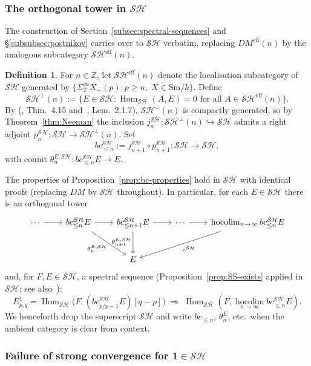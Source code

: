 \documentclass[12pt,a4paper]{article}
\theoremstyle{definition}
\newtheorem{definition}[theorem]{Definition}
\newcommand{\Sm}{\mathrm{Sm}}
\newcommand{\SH}{\mathcal{SH}}
\newcommand{\hocolim}{\operatorname*{hocolim}}
\newcommand{\Hom}{\operatorname{Hom}}
\newcommand{\Z}{\mathbb{Z}}
\begin{document}
\subsubsection{The orthogonal tower in $\SH$}
\label{subsubsec:SH-tower}

The construction of Section~\ref{subsec:spectral-sequences} and §\ref{subsubsec:postnikov}
carries over to $\SH$ verbatim, replacing $DM^{\mathrm{eff}}(n)$ by the analogous
subcategory $\SH^{\mathrm{eff}}(n)$.

\begin{definition}\label{def:SHeff-n}
For $n\in\Z$, let $\SH^{\mathrm{eff}}(n)$ denote the localisation subcategory of $\SH$
generated by $\{\Sigma_T^\infty X_+(p): p\geq n,\; X\in\Sm/k\}$.  Define
\[
  \SH^\perp(n) := \bigl\{E\in\SH : \Hom_{\SH}(A,E)=0
    \text{ for all }A\in\SH^{\mathrm{eff}}(n)\bigr\}.
\]
By (\cite{Jar00}, Thm.\ 4.15 and~\cite{Pel17}, Lem.\ 2.1.7), $\SH^\perp(n)$ is
compactly generated, so by Theorem~\ref{thm:Neeman} the inclusion
$j_n^{\SH}:\SH^\perp(n)\hookrightarrow\SH$ admits a right adjoint
$p_n^{\SH}:\SH\to\SH^\perp(n)$.  Set
\[
  bc_{\leq n}^{\SH} := j_{n+1}^{\SH}\circ p_{n+1}^{\SH}:\SH\longrightarrow\SH,
\]
with counit $\theta_n^{E,\SH}:bc_{\leq n}^{\SH}E\to E$.
\end{definition}

The properties of Proposition~\ref{prop:bc-properties} hold in $\SH$ with identical
proofs (replacing $DM$ by $\SH$ throughout).  In particular, for each $E\in\SH$
there is an orthogonal tower
\[
\begin{tikzcd}[column sep=2.2em, row sep=2.6em]
  \cdots \ar[r]
    & bc_{\leq n}^{\SH}E \ar[r] \ar[dr,"\theta_n^{E,\SH}"']
    & bc_{\leq n+1}^{\SH}E \ar[r] \ar[d,"\theta_{n+1}^{E,\SH}"']
    & \cdots \ar[r]
    & \hocolim_{n\to\infty}bc_{\leq n}^{\SH}E \ar[dll,"c^{\SH}"]
  \\
    &
    & E
    &
    &
\end{tikzcd}
\]
and, for $F,E\in\SH$, a spectral sequence (Proposition~\ref{prop:SS-exists} applied
in $\SH$; see also~\cite{Pel14}):
\[
  E^1_{p,q} = \Hom_{\SH}\!\bigl(F,(bc_{p/p-1}^{\SH}E)[q-p]\bigr)
  \;\Rightarrow\;
  \Hom_{\SH}(F,\hocolim_{n\to\infty}bc_{\leq n}^{\SH}E).
\]
We henceforth drop the superscript $\SH$ and write $bc_{\leq n}$, $\theta_n^E$, etc.\
when the ambient category is clear from context.

\subsubsection{Failure of strong convergence for $\mathbf{1}\in\SH$}
\end{document}
